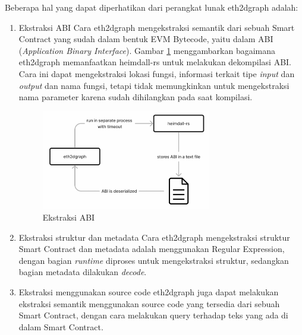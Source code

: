 Beberapa hal yang dapat diperhatikan dari perangkat lunak eth2dgraph adalah:

\begin{enumerate}
	\item Ekstraksi ABI \newline Cara eth2dgraph mengekstraksi semantik dari sebuah Smart Contract yang sudah dalam bentuk EVM Bytecode, yaitu dalam ABI (\textit{Application Binary Interface}). Gambar \ref{image:abi-extraction} menggambarkan bagaimana eth2dgraph memanfaatkan heimdall-rs untuk melakukan dekompilasi ABI. Cara ini dapat mengekstraksi lokasi fungsi, informasi terkait tipe \textit{input} dan \textit{output} dan nama fungsi, tetapi tidak memungkinkan untuk mengekstraksi nama parameter karena sudah dihilangkan pada saat kompilasi.
	      \begin{figure}[ht]
		      \centering
		      \includegraphics[width=0.7\textwidth]{resources/chapter-2/eth2dgraph-heimdall.png}
		      \caption{Ekstraksi ABI \parencite{aimar2023extraction}}
		      \label{image:abi-extraction}
	      \end{figure}
	\item Ekstraksi struktur dan metadata \newline Cara eth2dgraph mengekstraksi struktur Smart Contract dan metadata adalah menggunakan Regular Expression, dengan bagian \textit{runtime} diproses untuk mengekstraksi struktur, sedangkan bagian metadata dilakukan \textit{decode}.
	\item Ekstraksi menggunakan source code \newline eth2dgraph juga dapat melakukan ekstraksi semantik menggunakan source code yang tersedia dari sebuah Smart Contract, dengan cara melakukan query terhadap teks yang ada di dalam Smart Contract.
\end{enumerate}
